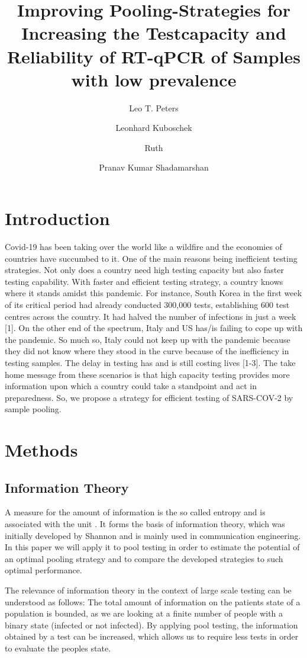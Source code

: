 \documentclass[fleqn,10pt]{wlscirep}
\title{Improving Pooling-Strategies for Increasing the Testcapacity and Reliability of RT-qPCR of Samples with low prevalence} %
\author[1,*]{Leo T. Peters}
\author[2]{Leonhard Kuboschek}
\author[1,2]{Ruth}
\author[2]{Pranav Kumar Shadamarshan}
\affil[1]{Affiliation, Department, City, Country}
\affil[2]{Affiliation, Department, City, Country}
\affil[*]{e-mail: leo.peters@tum.de}
\begin{document}
\flushbottom
\maketitle

\thispagestyle{empty}

\section{Introduction}
Covid-19 has been taking over the world like a wildfire and the economies of
countries have succumbed to it. One of the main reasons being inefficient
testing strategies. Not only does a country need high testing capacity but also
faster testing capability. With faster and efficient testing strategy, a country
knows where it stands amidst this pandemic. For instance, South Korea in
the first week of its critical period had already conducted 300,000 tests,
establishing 600 test centres across the country. It had halved the number of
infections in just a week [1]. On the other end of the spectrum, Italy and US
has/is failing to cope up with the pandemic. So much so, Italy could not keep
up with the pandemic because they did not know where they stood in the
curve because of the inefficiency in testing samples. The delay in testing has
and is still costing lives [1-3]. The take home message from these scenarios is
that high capacity testing provides more information upon which a country
could take a standpoint and act in preparedness. So, we propose a strategy for
efficient testing of SARS-COV-2 by sample pooling.


\section{Methods}

\subsection{Information Theory}
A measure for the amount of information is the so called \glqq entropy\grqq{} and is associated with the unit \si{\Bit}. It forms the basis of information theory, which was initially developed by Shannon \cite{Shannon} and is mainly used in communication engineering. In this paper we will apply it to pool testing in order to estimate the potential of an optimal pooling strategy and to compare the developed strategies to such optimal performance. 

The relevance of information theory in the context of large scale testing can be understood as follows: The total amount of information on the patients state of a population is bounded, as we are looking at a finite number of people with a binary state (infected or not infected). By applying pool testing, the information obtained by a test can be increased, which allows us to require less tests in order to evaluate the peoples state.
\end{document}
